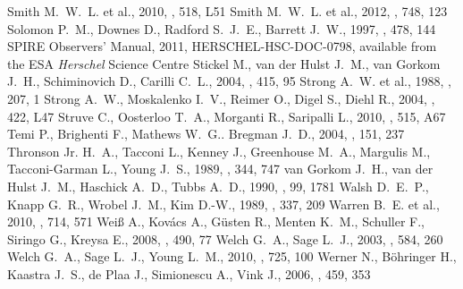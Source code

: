 \begin{thebibliography}{}
 Smith M.~W.~L. et al., 2010, \aap, 518, L51
 Smith M.~W.~L. et al., 2012, \apj, 748, 123
 Solomon P.~M., Downes D., Radford S.~J.~E., Barrett J.~W., 1997, \apj, 478, 144
 SPIRE Observers' Manual, 2011, HERSCHEL-HSC-DOC-0798, available from the ESA \emph{Herschel} Science Centre
 Stickel M., van der Hulst J.~M., van Gorkom J.~H., Schiminovich D., Carilli C.~L., 2004, \aap, 415, 95
 Strong A.~W. et al., 1988, \aap, 207, 1
 Strong A.~W., Moskalenko I.~V., Reimer O., Digel S., Diehl R., 2004, \aap, 422, L47
 Struve C., Oosterloo T.~A., Morganti R., Saripalli L., 2010, \aap, 515, A67
 Temi P., Brighenti F., Mathews W.~G.. Bregman J.~D., 2004, \apjs, 151, 237
 Thronson Jr. H.~A., Tacconi L., Kenney J., Greenhouse M.~A., Margulis M., Tacconi-Garman L., Young J.~S., 1989, \apj, 344, 747
 van Gorkom J.~H., van der Hulst J.~M., Haschick A.~D., Tubbs A.~D., 1990, \aj, 99, 1781
 Walsh D.~E.~P., Knapp G.~R., Wrobel J.~M., Kim D.-W., 1989, \apj, 337, 209
 Warren B.~E. et al., 2010, \apj, 714, 571
 Wei{\ss} A., Kov{\'a}cs A., G{\"u}sten R., Menten K.~M., Schuller F., Siringo G., Kreysa E., 2008, \aap, 490, 77
 Welch G.~A., Sage L.~J., 2003, \apj, 584, 260
 Welch G.~A., Sage L.~J., Young L.~M., 2010, \apj, 725, 100
 Werner N., B{\"o}hringer H., Kaastra J.~S., de Plaa J., Simionescu A., Vink J., 2006, \aap, 459, 353

\end{thebibliography}
